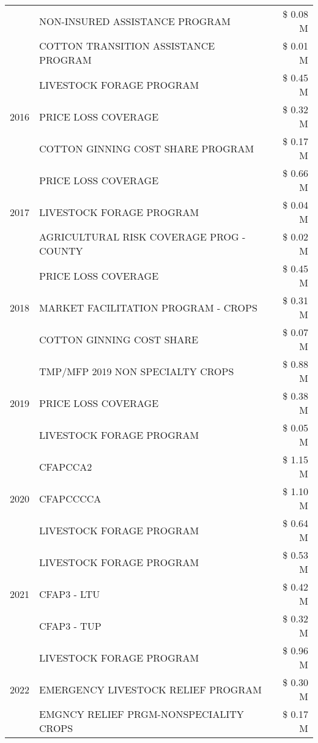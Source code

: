 \begin{tabular}{llr}
 & NON-INSURED ASSISTANCE PROGRAM & \$ 0.08 M \\
 & COTTON TRANSITION ASSISTANCE PROGRAM & \$ 0.01 M \\
\cline{1-3}
\multirow[t]{3}{*}{2016} & LIVESTOCK FORAGE PROGRAM & \$ 0.45 M \\
 & PRICE LOSS COVERAGE & \$ 0.32 M \\
 & COTTON GINNING COST SHARE PROGRAM & \$ 0.17 M \\
\cline{1-3}
\multirow[t]{3}{*}{2017} & PRICE LOSS COVERAGE & \$ 0.66 M \\
 & LIVESTOCK FORAGE PROGRAM & \$ 0.04 M \\
 & AGRICULTURAL RISK COVERAGE PROG - COUNTY & \$ 0.02 M \\
\cline{1-3}
\multirow[t]{3}{*}{2018} & PRICE LOSS COVERAGE & \$ 0.45 M \\
 & MARKET FACILITATION PROGRAM - CROPS & \$ 0.31 M \\
 & COTTON GINNING COST SHARE & \$ 0.07 M \\
\cline{1-3}
\multirow[t]{3}{*}{2019} & TMP/MFP 2019 NON SPECIALTY CROPS & \$ 0.88 M \\
 & PRICE LOSS COVERAGE & \$ 0.38 M \\
 & LIVESTOCK FORAGE PROGRAM & \$ 0.05 M \\
\cline{1-3}
\multirow[t]{3}{*}{2020} & CFAPCCA2 & \$ 1.15 M \\
 & CFAPCCCCA & \$ 1.10 M \\
 & LIVESTOCK FORAGE PROGRAM & \$ 0.64 M \\
\cline{1-3}
\multirow[t]{3}{*}{2021} & LIVESTOCK FORAGE PROGRAM & \$ 0.53 M \\
 & CFAP3 - LTU & \$ 0.42 M \\
 & CFAP3 - TUP & \$ 0.32 M \\
\cline{1-3}
\multirow[t]{3}{*}{2022} & LIVESTOCK FORAGE PROGRAM & \$ 0.96 M \\
 & EMERGENCY LIVESTOCK RELIEF PROGRAM & \$ 0.30 M \\
 & EMGNCY RELIEF PRGM-NONSPECIALITY CROPS & \$ 0.17 M \\
\cline{1-3}
\bottomrule
\end{tabular}
